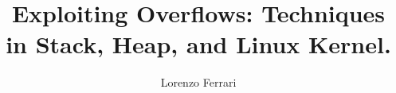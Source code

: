 \documentclass{theme/uniprthesis}
\title{Exploiting Overflows: Techniques in Stack, Heap, and Linux Kernel.}
\author{Lorenzo Ferrari}
\begin{document}
    


    

    
 
\maketitle
\newpage

\mbox{} %
\newpage

\renewcommand{\contentsname}{Index}
\tableofcontents
    
    
    





\end{document}
